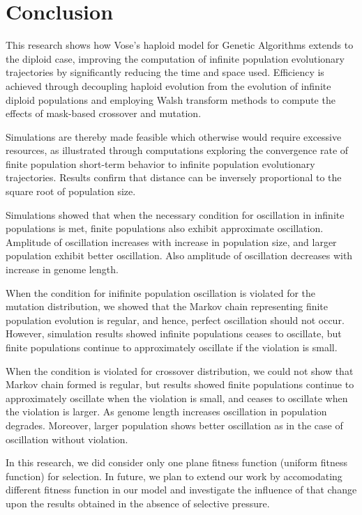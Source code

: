 \chapter{Conclusion}
This research shows how Vose's haploid model for Genetic Algorithms
extends to the diploid case, improving the computation of infinite
population evolutionary trajectories by significantly reducing the
time and space used.  Efficiency is achieved through decoupling
haploid evolution from the evolution of infinite diploid populations
and employing Walsh transform methods to compute the effects of
mask-based crossover and mutation.  

Simulations are thereby made feasible which otherwise would require
excessive resources, as illustrated through computations exploring 
the convergence rate of finite population short-term behavior to infinite population evolutionary trajectories. 
Results confirm that distance can be inversely proportional to the square root of population size.

Simulations showed that when the necessary condition for oscillation in infinite populations is met, 
finite populations also exhibit approximate oscillation. Amplitude of oscillation increases with 
increase in population size, and larger population exhibit better oscillation. Also amplitude of 
oscillation decreases with increase in genome length.

When the condition for inifinite population oscillation is violated for the mutation distribution, 
we showed that the Markov chain representing finite population evolution is regular, and hence, 
perfect oscillation should not occur. However, simulation results showed 
infinite populations ceases to oscillate, 
but finite populations continue to approximately oscillate if the violation is small. 

When the condition is violated for crossover distribution,
we could not show that Markov chain formed is regular, 
but results showed finite populations continue to approximately oscillate 
when the violation is small, and ceases to oscillate when the violation is larger. 
As genome length increases oscillation in population degrades. 
Moreover, larger population shows better oscillation 
as in the case of oscillation without violation.

In this research, we did consider only one plane fitness function (uniform fitness function) for selection.  
In future, we plan to extend our work by accomodating different fitness function in our model and investigate 
the influence of that change upon the results obtained in the absence of selective pressure.




